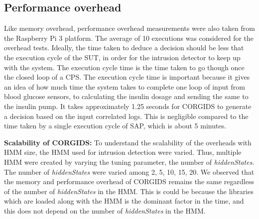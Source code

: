 \subsection{Performance overhead}
Like memory overhead, performance overhead measurements were also taken from the Raspberry Pi 3 platform. The average of 10 executions was considered for the overhead tests.  
Ideally, the time taken to deduce a decision should be less that the execution cycle of the \ac{SUT}, in order for the intrusion detector to keep up with the system. The execution cycle time is the time taken to go though once the closed loop of a \ac{CPS}. The execution cycle time is important because it gives an idea of how much time the system takes to complete one loop of input from blood glucose sensors, to calculating the insulin dosage and sending the same to the insulin pump. It takes approximately 1.25 seconds for \ac{CORGIDS} to generate a decision based on the input correlated logs. This is negligible compared to the time taken by a single execution cycle of \ac{SAP}, which is about 5 minutes.

\bigskip
\textbf{Scalability of CORGIDS:} To understand the scalability of the overheads with \ac{HMM} size, the \ac{HMM} used for intrusion detection were varied. Thus, multiple \ac{HMM} were created by varying the tuning parameter, the number of \textit{hiddenStates}. The number of \textit{hiddenStates} were varied among {2, 5, 10, 15, 20}. We observed that the memory and performance overhead of \ac{CORGIDS} remains the same regardless of the number of \textit{hiddenStates} in the \ac{HMM}. This is could be because the libraries which are loaded along with the \ac{HMM} is the dominant factor in the time, and this does not depend on the number of \textit{hiddenStates} in the \ac{HMM}.

